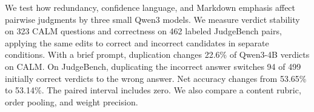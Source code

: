 We test how redundancy, confidence language, and Markdown emphasis affect pairwise judgments by three small Qwen3 models. We measure verdict stability on 323 CALM questions and correctness on 462 labeled JudgeBench pairs, applying the same edits to correct and incorrect candidates in separate conditions. With a brief prompt, duplication changes 22.6\% of Qwen3-4B verdicts on CALM. On JudgeBench, duplicating the incorrect answer switches 94 of 499 initially correct verdicts to the wrong answer. Net accuracy changes from 53.65\% to 53.14\%. The paired interval includes zero. We also compare a content rubric, order pooling, and weight precision.

